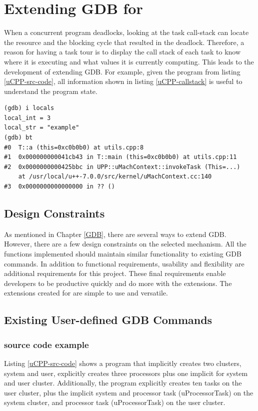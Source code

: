 \chapter{Extending GDB for \uCPP}
When a concurrent program deadlocks, looking at the task call-stack can locate
the resource and the blocking cycle that resulted in the deadlock. Therefore,
a reason for having a task tour is to display the call stack of each task to
know where it is executing and what values it is currently computing. This leads
to the development of extending GDB. For example, given the \uCPPS program from
listing \ref{uCPP-src-code}, all information shown in listing
\ref{uCPP-callstack} is useful to understand the program state.

\begin{lstlisting}[caption={Call stack of function \textbf{a()} in the \uCPPS
program from listing \ref{uCPP-src-code}}, label={uCPP-callstack}]
(gdb) i locals
local_int = 3
local_str = "example"
(gdb) bt
#0  T::a (this=0xc0b0b0) at utils.cpp:8
#1  0x000000000041cb43 in T::main (this=0xc0b0b0) at utils.cpp:11
#2  0x0000000000425bbc in UPP::uMachContext::invokeTask (This=...)
    at /usr/local/u++-7.0.0/src/kernel/uMachContext.cc:140
#3  0x0000000000000000 in ?? ()
\end{lstlisting}
\section{Design Constraints}
As mentioned in Chapter \ref{GDB}, there are several ways to extend GDB. However,
there are a few design constraints on the selected mechanism. All the functions
implemented should maintain similar functionality to existing GDB commands. In addition to functional
requirements, usability and flexibility are additional requirements for this
project. These final requirements enable developers to be productive quickly
and do more with the extensions. The extensions created for \uCPPS are simple
to use and versatile.

\section{Existing User-defined GDB Commands}
\subsection{\uCPPS source code example}
Listing \ref{uCPP-src-code} shows a \uCPPS program that implicitly creates two
clusters, system and user, explicitly creates three processors plus one
implicit for system and user cluster. Additionally, the program explicitly creates ten tasks on the
user cluster, plus the implicit system and processor task (uProcessorTask) on the system cluster, and
processor task (uProcessorTask) on the user cluster.

